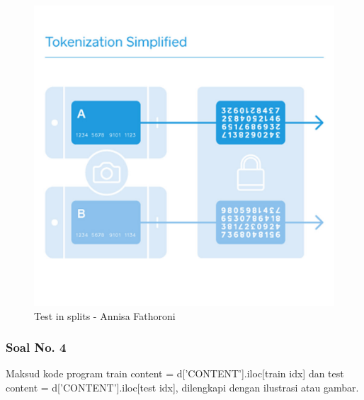 \begin{itemize}
\hfill \break
    \begin{figure}[!hbtp]
    \centering
    \includegraphics[scale=0.4]{figures/Chapter 7/1164067/Teori/Chapter7AnnisaFathoroni1.jpg}
    \caption{Test in splits - Annisa Fathoroni}
    \label{Test in splits - Annisa Fathoroni}
    \end{figure}

\end{itemize}

\subsubsection{Soal No. 4}
Maksud kode program train content = d[’CONTENT’].iloc[train idx] dan test content = d[’CONTENT’].iloc[test idx], dilengkapi dengan ilustrasi atau gambar.


